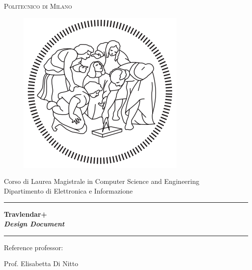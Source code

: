 \documentclass[a4paper,12pt,twoside]{report}
\begin{document}

\thispagestyle{empty}
\enlargethispage{60mm}
\begin{center}
\Large{\textsc{Politecnico di Milano}}\\
\begin{figure}[h]
\begin{center}
\includegraphics[scale=0.25]{images/logoPolimi.png}
\end{center}
\end{figure}
\vspace{-8mm}
\large{Corso di Laurea Magistrale in Computer Science and Engineering}\\
\large{Dipartimento di Elettronica e Informazione}\\
\vspace{25mm}

\begin{center}
\noindent\rule{17cm}{0.4pt}
\end{center}

\vspace{1mm}
{\textbf{\Huge{Travlendar+}}} \\
\vspace{5mm}
{\textbf{\textit{\Large{Design Document}}}}


\noindent\rule{17cm}{0.4pt}

\vspace{20mm}

\begin{center}
Reference professor:
\vspace{-4mm}
\end{center}
\begin{center}
Prof. Elisabetta Di Nitto
\end{center}


\end{center}
\end{document}
